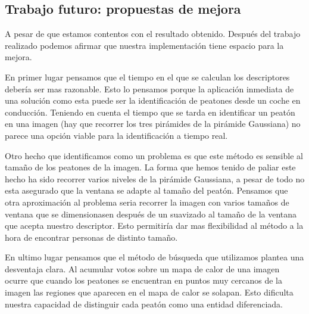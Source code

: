 \documentclass[a4paper,12pt]{article}
\begin{document}
\subsection{Trabajo futuro: propuestas de mejora}

A pesar de que estamos contentos con el resultado obtenido. Después del trabajo realizado podemos afirmar que nuestra implementación tiene espacio para la mejora.

En primer lugar pensamos que el tiempo en el que se calculan los descriptores debería ser mas razonable. Esto lo pensamos porque la aplicación inmediata de una solución como esta puede ser la identificación de peatones desde un coche en conducción. Teniendo en cuenta el tiempo que se tarda en identificar un peatón en una imagen (hay que recorrer los tres pirámides de la pirámide Gaussiana) no parece una opción viable para la identificación a tiempo real.

Otro hecho que identificamos como un problema es que este método es sensible al tamaño de los peatones de la imagen. La forma que hemos tenido de paliar este hecho ha sido recorrer varios niveles de la pirámide Gaussiana, a pesar de todo no esta asegurado que la ventana se adapte al tamaño del peatón. Pensamos que otra aproximación al problema seria recorrer la imagen con varios tamaños de ventana que se dimensionasen después de un suavizado al tamaño de la ventana que acepta nuestro descriptor. Esto permitiría dar mas flexibilidad al método a la hora de encontrar personas de distinto tamaño.

En ultimo lugar pensamos que el método de búsqueda que utilizamos plantea una desventaja clara. Al acumular votos sobre un mapa de calor de una imagen ocurre que cuando los peatones se encuentran en puntos muy cercanos de la imagen las regiones que aparecen en el mapa de calor se solapan. Esto dificulta nuestra capacidad de distinguir cada peatón como una entidad diferenciada.

\normalsize


%
%
\end{document}
